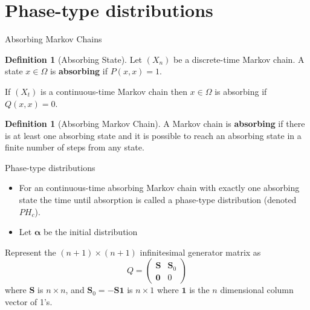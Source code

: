 \documentclass{beamer}
\theoremstyle{definition}
\newtheorem{defn}[theorem]{Definition}
\begin{document}
\section{Phase-type distributions}

\begin{frame}{Absorbing Markov Chains}
    \begin{defn}[Absorbing State]
    Let $(X_n)$ be a discrete-time Markov chain.
A state $x \in \Omega$ is \textbf{absorbing} if $P(x,x) = 1$.

If $(X_t)$ is a continuous-time Markov chain then $x \in \Omega$ is absorbing if $Q(x,x) = 0$.
\end{defn}

\begin{defn}[Absorbing Markov Chain]
A Markov chain is \textbf{absorbing} if there is at least one absorbing state and it is possible to reach an absorbing state in a finite number of steps from any state.
\end{defn}

\begin{figure}[H]
    \centering
\end{figure}   
\end{frame}

\begin{frame}{Phase-type distributions}
\begin{itemize}
    \item For an continuous-time absorbing Markov chain with exactly one absorbing state the time until absorption is called a phase-type distribution (denoted $PH_c$).
    \item Let $\boldsymbol{\alpha}$ be the initial distribution
\end{itemize}
Represent the $(n + 1) \times (n + 1)$ infinitesimal generator matrix as
$$
Q = \begin{pmatrix}
\mathbf{S} & \mathbf{S}_0\\
\mathbf{0} & 0
\end{pmatrix}
$$
where $\mathbf{S}$ is $n \times n$, and $\mathbf{S}_0 = - \mathbf{S} \mathbf{1}$ is $n \times 1$ where $\mathbf{1}$ is the $n$ dimensional column vector of 1's.
\end{frame}
\end{document}
